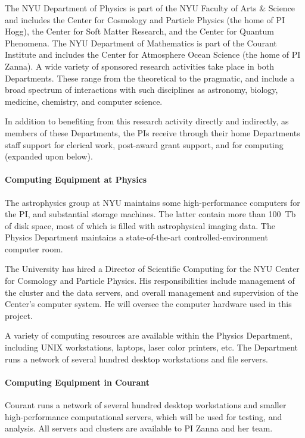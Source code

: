 The NYU Department of Physics is part of the NYU Faculty of Arts \& Science and includes the Center for Cosmology and Particle Physics (the home of PI Hogg), the Center for Soft Matter Research, and the Center for Quantum Phenomena.
The NYU Department of Mathematics is part of the Courant Institute and includes the Center for Atmosphere Ocean Science (the home of PI Zanna).
A wide variety of sponsored
research activities take place in both Departments.
These range from
the theoretical to the pragmatic, and include a broad spectrum of
interactions with such disciplines as astronomy, biology, medicine, chemistry, and computer science.

In addition to benefiting from this research activity directly and indirectly, as members of these Departments, the PIs receive through their home Departments staff support for clerical work, post-award grant support, and for computing (expanded upon below).

\paragraph{Computing Equipment at Physics}
The astrophysics group at NYU maintains some high-performance computers
for the PI, and substantial storage machines.
The latter contain more than 100~Tb of disk space, most of which is filled
with astrophysical imaging data.  The Physics Department maintains a
state-of-the-art controlled-environment computer room.

The University has hired a Director of Scientific Computing for the
NYU Center for Cosmology and Particle Physics.  His
responsibilities include management of the cluster and the data
servers, and overall management and supervision of the Center's
computer system.  He will oversee the computer hardware used in this
project.

A variety of computing resources are available within the Physics
Department, including UNIX workstations, laptops, laser color
printers, etc.  The Department runs a network of several hundred
desktop workstations and file servers.

\paragraph{Computing Equipment in Courant}
Courant runs a network of several hundred desktop workstations and smaller high-performance computational servers, which will be used for testing, and analysis. All servers and
clusters are available to PI Zanna and her team.

